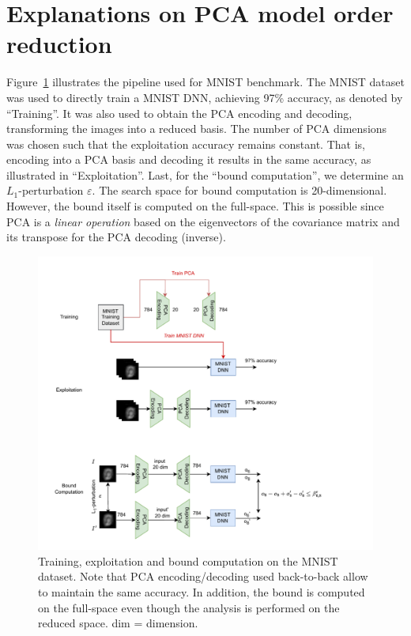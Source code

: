 \section{Explanations on PCA model order reduction}


Figure~\ref{fig.MNIST} illustrates the pipeline used for MNIST benchmark. The MNIST dataset was used to directly train a MNIST DNN, achieving 97\% accuracy, as denoted by ``Training''. 
%
It was also used to obtain the PCA encoding and decoding, transforming the images into a reduced basis. The number of PCA dimensions was chosen such that the exploitation accuracy remains constant. That is, encoding into a PCA basis and decoding it results in the same accuracy, as illustrated in ``Exploitation''. 
%
Last, for the ``bound computation'', we determine an $L_1$-perturbation $\varepsilon$. The search space for bound computation is 20-dimensional. However, the bound itself is computed on the full-space. This is possible since PCA is a \emph{linear operation} based on the eigenvectors of the covariance matrix and its transpose for the PCA decoding (inverse).

\begin{figure}[]
	\centering
	\includegraphics[scale=0.9]{MNIST.pdf} \hspace{1.5cm}
	\caption{Training, exploitation and bound computation on the MNIST dataset. Note that PCA encoding/decoding used back-to-back allow to maintain the same accuracy. In addition, the bound is computed on the full-space even though the analysis is performed on the reduced space. dim = dimension.}
	\label{fig.MNIST}
\end{figure}	

